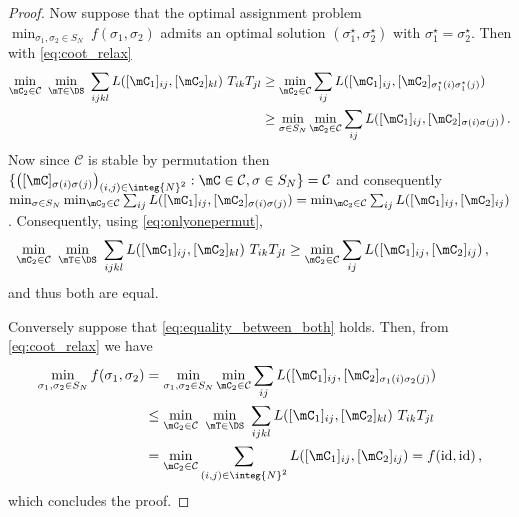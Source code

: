 \begin{proof}
	Now suppose that the optimal assignment problem $\min_{\sigma_1, \sigma_2 \in S_N} \ f(\sigma_1, \sigma_2)$ admits an optimal solution $(\sigma_1^\star, \sigma_2^\star)$ with $\sigma_1^\star=\sigma_2^\star$. Then with \cref{eq:coot_relax}
	\begin{equation}
		\label{eq:onlyonepermut}
		\begin{split}
			\min_{\mC_2 \in \mathcal{C}} \ \min_{\mT \in \DS} \ \sum_{ijkl} L([\mC_1]_{ij}, [\mC_2]_{kl}) \ T_{ik} T_{jl} &\geq \min_{\mC_2 \in \mathcal{C}} \sum_{ij} L([\mC_1]_{ij}, [\mC_2]_{\sigma^\star_1(i)\sigma^\star_1(j)}) \\
			&\geq \min_{\sigma \in S_N} \min_{\mC_2 \in \mathcal{C}} \sum_{ij} L([\mC_1]_{ij}, [\mC_2]_{\sigma(i)\sigma(j)})\,.
		\end{split}
	\end{equation}
	Now since $\mathcal{C}$ is stable by permutation then $\{\left([\mC]_{\sigma(i)\sigma(j)}\right)_{(i,j) \in \integ{N}^2}: \mC \in \mathcal{C}, \sigma \in S_N\} = \mathcal{C}$ and consequently $\min_{\sigma \in S_N} \min_{\mC_2 \in \mathcal{C}} \sum_{ij} L([\mC_1]_{ij}, [\mC_2]_{\sigma(i)\sigma(j)}) = \min_{\mC_2 \in \mathcal{C}} \sum_{ij} L([\mC_1]_{ij}, [\mC_2]_{ij})$. Consequently, using \cref{eq:onlyonepermut},
	\begin{equation}
		\begin{split}
			\min_{\mC_2 \in \mathcal{C}} \ \min_{\mT \in \DS} \ \sum_{ijkl} L([\mC_1]_{ij}, [\mC_2]_{kl}) \ T_{ik} T_{jl} &\geq \min_{\mC_2 \in \mathcal{C}} \sum_{ij} L([\mC_1]_{ij}, [\mC_2]_{ij})\,,
		\end{split}
	\end{equation}
	and thus both are equal. 
	
	Conversely suppose that \cref{eq:equality_between_both} holds. Then, from \cref{eq:coot_relax} we have
	\begin{equation}
		\label{eq:coot_relax}
		\begin{split}
			\min_{\sigma_1, \sigma_2 \in S_N} f(\sigma_1, \sigma_2) &= \min_{\sigma_1, \sigma_2 \in S_N} \min_{\mC_2 \in \mathcal{C}} \sum_{ij} L([\mC_1]_{ij}, [\mC_2]_{\sigma_1(i)\sigma_2(j)}) \\
			&\leq \min_{\mC_2 \in \mathcal{C}} \ \min_{\mT \in \DS} \ \sum_{ijkl} L([\mC_1]_{ij}, [\mC_2]_{kl}) \ T_{ik} T_{jl} \\
			&=\min_{\mC_2 \in \mathcal{C}} \sum_{(i,j) \in \integ{N}^2} L([\mC_1]_{ij}, [ \mC_2]_{ij}) = f(\operatorname{id}, \operatorname{id})\,,
		\end{split}
	\end{equation}
	which concludes the proof.
\end{proof}
